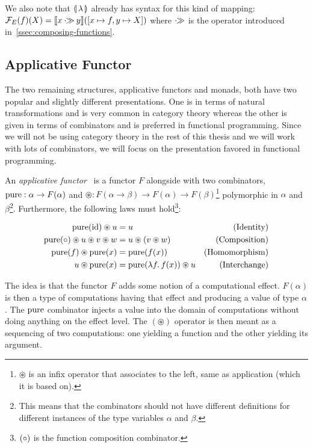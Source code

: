 We also note that $\llparenthesis \, \lambda \, \rrparenthesis$ already has syntax for this kind of
mapping: $\mathcal{F}_E(f)(X) = \llbracket x \mathbin{\cdot\!\!\gg} y \rrbracket([x \mapsto f, y \mapsto X])$ where
$\mathbin{\cdot\!\!\gg}$ is the operator introduced in~\ref{ssec:composing-functions}.


\subsection{Applicative Functor}
\label{ssec:applicative-functor}

The two remaining structures, applicative functors and monads, both have
two popular and slightly different presentations. One is in terms of
natural transformations and is very common in category theory whereas the
other is given in terms of combinators and is preferred in functional
programming. Since we will not be using category theory in the rest of this
thesis and we will work with lots of combinators, we will focus on the
presentation favored in functional programming.

\begin{definition}
  An \emph{applicative functor}~\cite{mcbride2008applicative} is a functor
  $F$ alongside with two combinators, $\operatorname{pure} : \alpha \to F(\alpha)$ and
  $\circledast : F(\alpha \to \beta) \to F(\alpha) \to
  F(\beta)$\footnote{$\circledast$ is an infix operator that associates to
    the left, same as application (which it is based on).}  polymorphic in
  $\alpha$ and $\beta$\footnote{This means that the combinators should not
    have different definitions for different instances of the type
    variables $\alpha$ and $\beta$.}. Furthermore, the following laws must
  hold\footnote{$({\mathbin{\circ}})$ is the function composition combinator.}:

  \begin{align}
    \label{law:app-identity}\operatorname{pure}(\mathrm{id}) \circledast u &= u & \text{(Identity)} \\
    \label{law:app-composition}\operatorname{pure}({\mathbin{\circ}}) \circledast u \circledast v \circledast w &= u \circledast (v \circledast w) & \text{(Composition)} \\
    \label{law:app-homomorphism}\operatorname{pure}(f) \circledast \operatorname{pure}(x) &= \operatorname{pure}(f(x)) & \text{(Homomorphism)} \\
    \label{law:app-interchange}u \circledast \operatorname{pure}(x) &= \operatorname{pure}(\lambda f.\, f(x)) \circledast u & \text{(Interchange)}
  \end{align}
\end{definition}

The idea is that the functor $F$ adds some notion of a computational
effect. $F(\alpha)$ is then a type of computations having that effect and
producing a value of type $\alpha$. The $\operatorname{pure}$ combinator injects a value
into the domain of computations without doing anything on the effect
level. The $(\circledast)$ operator is then meant as a sequencing of two
computations: one yielding a function and the other yielding its argument.

